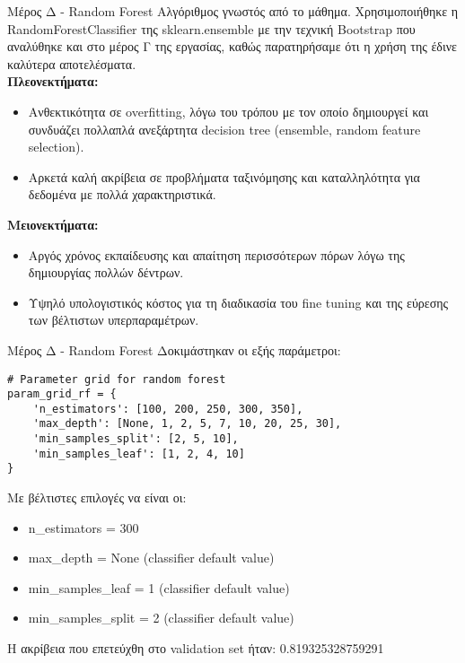 \documentclass{beamer}
\begin{document}
\begin{frame}[fragile]{Μέρος Δ - Random Forest}
Αλγόριθμος γνωστός από το μάθημα. Χρησιμοποιήθηκε η RandomForestClassifier της sklearn.ensemble με την τεχνική Bootstrap που αναλύθηκε και στο μέρος Γ της εργασίας, καθώς παρατηρήσαμε ότι η χρήση της έδινε καλύτερα αποτελέσματα.\\
\textbf{Πλεονεκτήματα:}
\begin{itemize}
    \item Ανθεκτικότητα σε overfitting, λόγω του τρόπου με τον οποίο δημιουργεί και συνδυάζει πολλαπλά ανεξάρτητα decision tree (ensemble, random feature selection).
    \item Αρκετά καλή ακρίβεια σε προβλήματα ταξινόμησης και καταλληλότητα για δεδομένα με πολλά χαρακτηριστικά.
\end{itemize}
\textbf{Μειονεκτήματα:}
\begin{itemize}
    \item Αργός χρόνος εκπαίδευσης και απαίτηση περισσότερων πόρων λόγω της δημιουργίας πολλών δέντρων.
    \item Υψηλό υπολογιστικός κόστος για τη διαδικασία του fine tuning και της εύρεσης των βέλτιστων υπερπαραμέτρων.
\end{itemize}
\end{frame}

\begin{frame}[fragile]{Μέρος Δ - Random Forest}
Δοκιμάστηκαν οι εξής παράμετροι:
\lstset{style=python}
\begin{lstlisting}
# Parameter grid for random forest
param_grid_rf = {
    'n_estimators': [100, 200, 250, 300, 350],
    'max_depth': [None, 1, 2, 5, 7, 10, 20, 25, 30],
    'min_samples_split': [2, 5, 10],
    'min_samples_leaf': [1, 2, 4, 10]
}
\end{lstlisting}
Με βέλτιστες επιλογές να είναι οι:
\begin{itemize}
    \item n\_estimators = 300
    \item max\_depth = None (classifier default value)
    \item min\_samples\_leaf = 1 (classifier default value)
    \item min\_samples\_split = 2 (classifier default value)
\end{itemize}

Η ακρίβεια που επετεύχθη στο validation set ήταν: 0.819325328759291
\end{frame}
\end{document}

